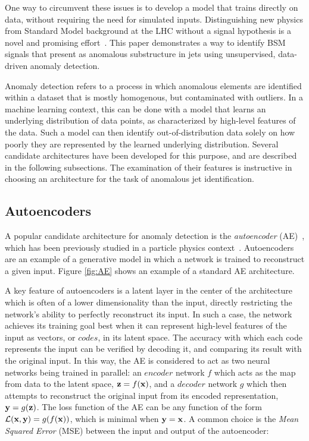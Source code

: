 \documentclass[11pt, a4paper]{article}
\begin{document}
One way to circumvent these issues is to develop a model that trains directly on data, without requiring the need for simulated inputs.
Distinguishing new physics from Standard Model background at the LHC without a signal hypothesis is a novel and promising effort~\cite{Heimel_2019, deepAutoencoders, CWoLa, cheng2021variational}. 
This paper demonstrates a way to identify BSM signals that present as anomalous substructure in jets using unsupervised, data-driven anomaly detection. 

Anomaly detection refers to a process in which anomalous elements are identified within a dataset that is mostly homogenous, but contaminated with outliers. 
In a machine learning context, this can be done with a model that learns an underlying distribution of data points, as characterized by high-level features of the data. 
Such a model can then identify out-of-distribution data solely on how poorly they are represented by the learned underlying distribution. 
Several candidate architectures have been developed for this purpose, and are described in the following subsections.
The examination of their features is instructive in choosing an architecture for the task of anomalous jet identification.

\subsection{Autoencoders}

A popular candidate architecture for anomaly detection is the \textit{autoencoder} 
(AE)~\cite{bank2020autoencoders}, which has been previously studied in a particle physics context~\cite{Farina_2020, Heimel_2019}.
Autoencoders are an example of a generative model in which a network is trained to reconstruct a given input. 
Figure \ref{fig:AE} shows an example of a standard AE architecture.

A key feature of autoencoders is a latent layer in the center of the architecture which is often of a lower dimensionality than the input, directly restricting the network's ability to perfectly reconstruct its input. 
In such a case, the network achieves its training goal best when it can represent high-level features of the input as vectors, or $codes$, in its latent space. 
The accuracy with which each code represents the input can be verified by decoding it, and comparing its result with the original input. 
In this way, the AE is considered to act as two neural networks being trained in parallel: an $encoder$ network $f$
which acts as the map from data to the latent space, ${\textbf z}=f({\textbf x})$, and
a $decoder$ network $g$ which then attempts to reconstruct the original input from 
its encoded representation, ${\textbf y}=g({\textbf z})$. 
The loss function of the AE can be any function of the form $\mathcal{L}({\textbf x}, {\textbf y})=g(f({\textbf x}))$, which 
is minimal when ${\textbf y}={\textbf x}$. 
A common choice is the {\it Mean Squared Error} (MSE)
between the input and output of the autoencoder:
\end{document}
